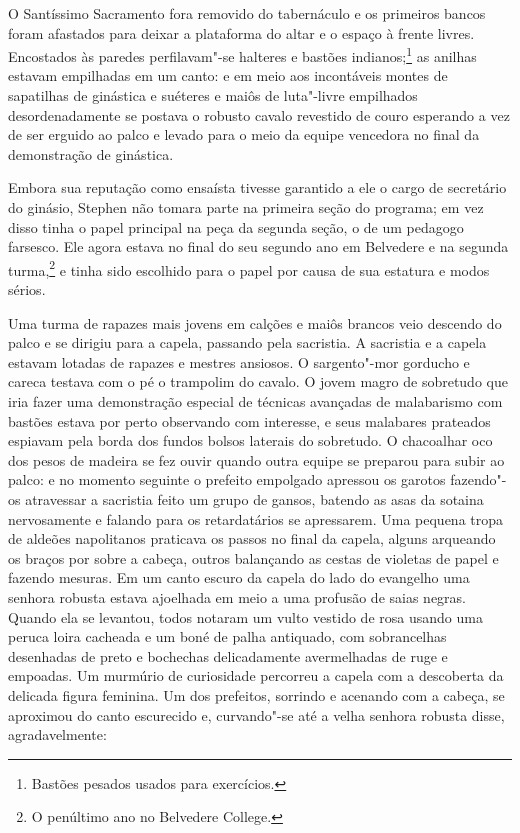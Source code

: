 O Santíssimo Sacramento fora removido do tabernáculo e os primeiros
bancos foram afastados para deixar a plataforma do altar e o
espaço à frente livres. Encostados às paredes perfilavam"-se halteres e
bastões indianos;\footnote{ Bastões pesados usados para exercícios.} as
anilhas estavam empilhadas em um canto: e em meio aos incontáveis
montes de sapatilhas de ginástica e suéteres e maiôs de luta"-livre
empilhados desordenadamente se postava o robusto cavalo revestido de
couro esperando a vez de ser erguido ao palco e levado para o meio da
equipe vencedora no final da demonstração de ginástica.

Embora sua reputação como ensaísta tivesse garantido a ele o cargo de
secretário do ginásio, Stephen não tomara parte na primeira seção do
programa; em vez disso tinha o papel principal na peça da segunda
seção, o de um pedagogo farsesco. Ele agora estava no final do seu
segundo ano em Belvedere e na segunda turma,\footnote{ O penúltimo ano
no Belvedere College.} e tinha sido escolhido para o papel por causa
de sua estatura e modos sérios.

Uma turma de rapazes mais jovens em calções e maiôs brancos veio
descendo do palco e se dirigiu para a capela, passando pela sacristia.
A sacristia e a capela estavam lotadas de rapazes e mestres ansiosos. O
sargento"-mor gorducho e careca testava com o pé o trampolim do cavalo.
O jovem magro de sobretudo que iria fazer uma demonstração especial de
técnicas avançadas de malabarismo com bastões estava por perto
observando com interesse, e seus malabares prateados espiavam pela
borda dos fundos bolsos laterais do sobretudo. O chacoalhar oco dos
pesos de madeira se fez ouvir quando outra equipe se preparou para
subir ao palco: e no momento seguinte o prefeito empolgado apressou os
garotos fazendo"-os atravessar a sacristia feito um grupo de gansos,
batendo as asas da sotaina nervosamente e falando para os retardatários
se apressarem. Uma pequena tropa de aldeões napolitanos praticava os
passos no final da capela, alguns arqueando os braços por sobre a
cabeça, outros balançando as cestas de violetas de papel e fazendo
mesuras. Em um canto escuro da capela do lado do evangelho uma senhora
robusta estava ajoelhada em meio a uma profusão de saias negras. Quando
ela se levantou, todos notaram um vulto vestido de rosa usando uma
peruca loira cacheada e um boné de palha antiquado, com sobrancelhas
desenhadas de preto e bochechas delicadamente avermelhadas de ruge e
empoadas. Um murmúrio de curiosidade percorreu a capela com a
descoberta da delicada figura feminina. Um dos prefeitos, sorrindo e
acenando com a cabeça, se aproximou do canto escurecido e, curvando"-se
até a velha senhora robusta disse, agradavelmente:

